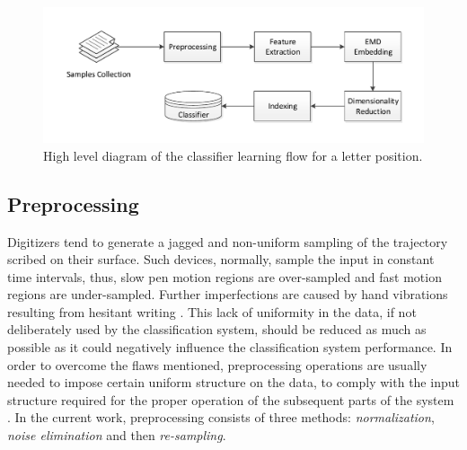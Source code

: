 \documentclass[10pt, conference, compsocconf]{IEEEtran}
\theoremstyle{definition}
\begin{document}
\begin{figure}
\centering
\includegraphics[width=1\columnwidth]{./figures/letters_classifier_learning_flow}       
\caption{High level diagram of the classifier learning flow for a letter position.}
\label{fig:letters_classifier_learning_flow}
\end{figure}

\subsection{Preprocessing}
Digitizers tend to generate a jagged and non-uniform sampling of the trajectory scribed on their surface.
Such devices, normally, sample the input in constant time intervals, thus, slow pen motion regions are over-sampled and fast motion regions are under-sampled.
Further imperfections are caused by hand vibrations resulting from hesitant writing \cite{huang2009preprocessing}.
This lack of uniformity in the data, if not deliberately used by the classification system, should be reduced as much as possible as it could negatively influence the classification system performance.
In order to overcome the flaws mentioned, preprocessing operations are usually needed to impose certain uniform structure on the data, to comply with the input structure required for the proper operation of the subsequent parts of the system \cite{al2011online}. In the current work, preprocessing consists of three methods: \emph{normalization}, \emph{noise elimination} and then \emph{re-sampling}.
\end{document}
